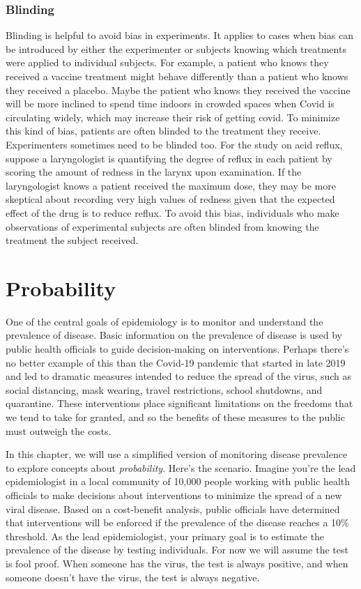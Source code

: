 \documentclass[
]{book}
\begin{document}
\subsection{Blinding}\label{blinding}

Blinding is helpful to avoid bias in experiments. It applies to cases when bias can be introduced by either the experimenter or subjects knowing which treatments were applied to individual subjects. For example, a patient who knows they received a vaccine treatment might behave differently than a patient who knows they received a placebo. Maybe the patient who knows they received the vaccine will be more inclined to spend time indoors in crowded spaces when Covid is circulating widely, which may increase their risk of getting covid. To minimize this kind of bias, patients are often blinded to the treatment they receive. Experimenters sometimes need to be blinded too. For the study on acid reflux, suppose a laryngologist is quantifying the degree of reflux in each patient by scoring the amount of redness in the larynx upon examination. If the laryngologist knows a patient received the maximum dose, they may be more skeptical about recording very high values of redness given that the expected effect of the drug is to reduce reflux. To avoid this bias, individuals who make observations of experimental subjects are often blinded from knowing the treatment the subject received.

\chapter{Probability}\label{probability}

One of the central goals of epidemiology is to monitor and understand the prevalence of disease. Basic information on the prevalence of disease is used by public health officials to guide decision-making on interventions. Perhaps there's no better example of this than the Covid-19 pandemic that started in late 2019 and led to dramatic measures intended to reduce the spread of the virus, such as social distancing, mask wearing, travel restrictions, school shutdowns, and quarantine. These interventions place significant limitations on the freedoms that we tend to take for granted, and so the benefits of these measures to the public must outweigh the costs.

In this chapter, we will use a simplified version of monitoring disease prevalence to explore concepts about \emph{probability}. Here's the scenario. Imagine you're the lead epidemiologist in a local community of 10,000 people working with public health officials to make decisions about interventions to minimize the spread of a new viral disease. Based on a cost-benefit analysis, public officials have determined that interventions will be enforced if the prevalence of the disease reaches a 10\% threshold. As the lead epidemiologist, your primary goal is to estimate the prevalence of the disease by testing individuals. For now we will assume the test is fool proof. When someone has the virus, the test is always positive, and when someone doesn't have the virus, the test is always negative.
\end{document}
